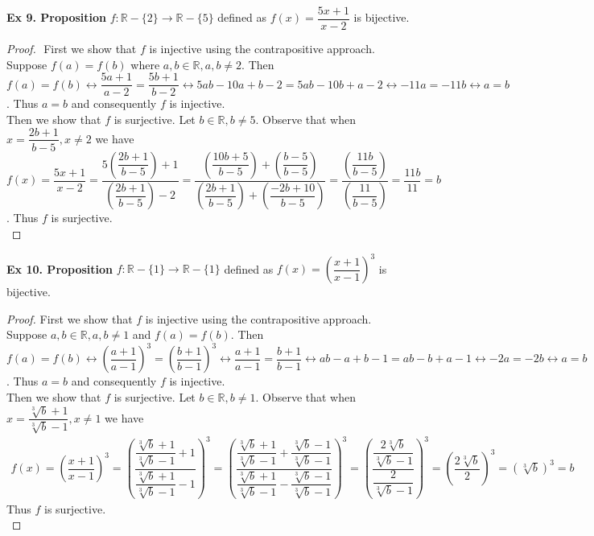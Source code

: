 \documentclass{article}
\begin{document}
\noindent\textbf{Ex 9. Proposition} $f: \mathbb{R} - \{2\} \rightarrow \mathbb{R} - \{5\}$ defined as $f(x)=\dfrac{5x+1}{x-2}$ is bijective.
\begin{proof}
$ $\newline
First we show that $f$ is injective using the contrapositive approach. Suppose $f(a)=f(b)$ where $a, b \in \mathbb{R}, a, b \neq 2$. Then $f(a)=f(b) \leftrightarrow \dfrac{5a+1}{a-2}=\dfrac{5b+1}{b-2} \leftrightarrow 5ab-10a+b-2=5ab-10b+a-2 \leftrightarrow -11a=-11b \leftrightarrow a = b$. Thus $a=b$ and consequently $f$ is injective.\\

\noindent Then we show that $f$ is surjective. Let $b \in \mathbb{R}, b \neq 5$. Observe that when $x=\dfrac{2b+1}{b-5}, x \neq 2$ we have $f(x)=\dfrac{5x+1}{x-2}=\dfrac{5\left(\dfrac{2b+1}{b-5}\right)+1}{\left(\dfrac{2b+1}{b-5}\right)-2}=\dfrac{\left(\dfrac{10b+5}{b-5}\right)+\left(\dfrac{b-5}{b-5}\right)}{\left(\dfrac{2b+1}{b-5}\right)+\left(\dfrac{-2b+10}{b-5}\right)}=\dfrac{\left(\dfrac{11b}{b-5}\right)}{\left(\dfrac{11}{b-5}\right)}=\dfrac{11b}{11}=b$. Thus $f$ is surjective.\\
\end{proof}
\newpage
\noindent\textbf{Ex 10. Proposition} $f: \mathbb{R} - \{1\} \rightarrow \mathbb{R} - \{1\}$ defined as $f(x)=\left(\dfrac{x+1}{x-1}\right)^3$ is bijective.\\
\begin{proof}
First we show that $f$ is injective using the contrapositive approach. Suppose $a, b \in \mathbb{R}, a,b \neq 1$ and $f(a)=f(b)$. Then $f(a)=f(b) \leftrightarrow \left(\dfrac{a+1}{a-1}\right)^3 = \left(\dfrac{b+1}{b-1}\right)^3  \leftrightarrow \dfrac{a+1}{a-1} = \dfrac{b+1}{b-1} \leftrightarrow ab-a+b-1=ab-b+a-1 \leftrightarrow -2a=-2b \leftrightarrow a = b$. Thus $a=b$ and consequently $f$ is injective.\\

\noindent Then we show that $f$ is surjective. Let $b \in \mathbb{R}, b \neq 1$. Observe that when $x=\dfrac{\sqrt[3]{b}+1}{\sqrt[3]{b}-1}, x \neq 1$ we have
\begin{align*}
f(x)=\left(\dfrac{x+1}{x-1}\right)^3=\left(\dfrac{\dfrac{\sqrt[3]{b}+1}{\sqrt[3]{b}-1}+1}{\dfrac{\sqrt[3]{b}+1}{\sqrt[3]{b}-1}-1}\right)^3=\left(\dfrac{\dfrac{\sqrt[3]{b}+1}{\sqrt[3]{b}-1}+\dfrac{\sqrt[3]{b}-1}{\sqrt[3]{b}-1}}{\dfrac{\sqrt[3]{b}+1}{\sqrt[3]{b}-1}-\dfrac{\sqrt[3]{b}-1}{\sqrt[3]{b}-1}}\right)^3=\left(\dfrac{\dfrac{2\sqrt[3]{b}}{\sqrt[3]{b}-1}}{\dfrac{2}{\sqrt[3]{b}-1}}\right)^3=\left(\dfrac{2\sqrt[3]{b}}{2}\right)^3=\left(\sqrt[3]{b}\right)^3=b
\end{align*}
Thus $f$ is surjective.\\
\end{proof}
\end{document}
